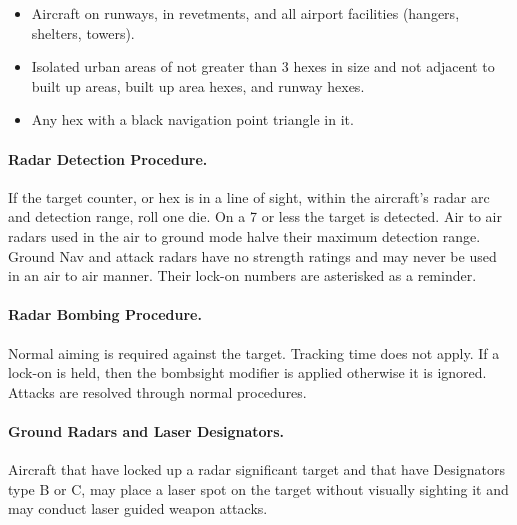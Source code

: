 \begin{advancedrules}
\begin{itemize}
    \item Aircraft on runways, in revetments, and all airport facilities (hangers, shelters, towers).

    \item Isolated urban areas of not greater than 3 hexes in size and not adjacent to built up areas, built up area hexes, and runway hexes.
    
    \item Any hex with a black navigation point triangle in it.

\end{itemize}

\paragraph{Radar Detection Procedure.} If the target counter, or hex is in a line of sight, within the aircraft's radar arc and detection range, roll one die. On a 7 or less the target is detected. Air to air radars used in the air to ground mode halve their maximum detection range. Ground Nav and attack radars have no strength ratings and may never be used in an air to air manner. Their lock-on numbers are asterisked as a reminder.

\paragraph{Radar Bombing Procedure.} Normal aiming is required against the target. Tracking time does not apply. If a lock-on is held, then the bombsight modifier is applied otherwise it is ignored. Attacks are resolved through normal procedures.

\paragraph{Ground Radars and Laser Designators.} Aircraft that have locked up a radar significant target and that have Designators type B or C, may place a laser spot on the target without visually sighting it and may conduct laser guided weapon attacks.


\end{advancedrules}

